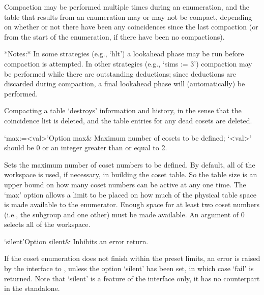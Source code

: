 Compaction may be performed  multiple times during an enumeration, and
the table that results from an  enumeration may or may not be compact,
depending on whether or not there have been any coincidences since the
last compaction (or  from the start of the  enumeration, if there have
been no compactions).

*Notes:*
In some strategies (e.g., `hlt') a lookahead phase may be  run  before
compaction is attempted. In  other  strategies  (e.g.,  `sims  :=  3')
compaction may be performed while there  are  outstanding  deductions;
since deductions are discarded during compaction,  a  final  lookahead
phase will (automatically) be performed.

Compacting a table \lq{}destroys'  information  and  history,  in  the
sense that the coincidence list is deleted, and the table entries  for
any dead cosets are deleted.

%
%
%

\>`max:=<val>'{Option max}&
Maximum number of cosets to be defined;
`<val>' should be $0$ or an integer greater than or equal to 2.

Sets the maximum  number of coset numbers to  be defined.  By default,
all  of the workspace  is used,  if necessary,  in building  the coset
table.  So the table size is  an upper bound on how many coset numbers
can be active at any one time.   The `max' option allows a limit to be
placed on  how much of the  physical table space is  made available to
the enumerator.   Enough space for  at least two coset  numbers (i.e.,
the subgroup and one other) must  be made available.  An argument of 0
selects all of the workspace.

\enditems



\beginitems

\>`silent'{Option silent}& 
Inhibits an error return.

If the coset enumeration does not finish within the preset limits,  an
error is raised by the interface to {\GAP}, unless the option `silent'
has been set, in which case `fail' is returned. Note that `silent'  is
a feature of the {\GAP} interface only, it has no counterpart  in  the
{\ACE} standalone.

